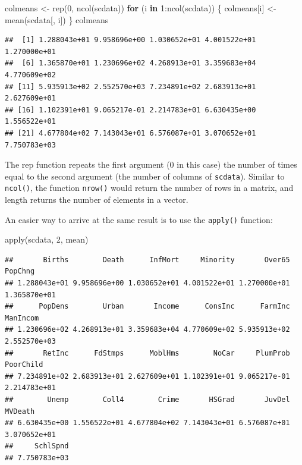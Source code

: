 \documentclass[
]{book}
\newenvironment{Shaded}{\begin{snugshade}}{\end{snugshade}}
\newcommand{\ControlFlowTok}[1]{\textcolor[rgb]{0.13,0.29,0.53}{\textbf{#1}}}
\newcommand{\DecValTok}[1]{\textcolor[rgb]{0.00,0.00,0.81}{#1}}
\newcommand{\FunctionTok}[1]{\textcolor[rgb]{0.00,0.00,0.00}{#1}}
\newcommand{\NormalTok}[1]{#1}
\newcommand{\OtherTok}[1]{\textcolor[rgb]{0.56,0.35,0.01}{#1}}
\newcommand{\SpecialCharTok}[1]{\textcolor[rgb]{0.00,0.00,0.00}{#1}}
\begin{document}
\begin{Shaded}
\begin{Highlighting}[]
\NormalTok{colmeans }\OtherTok{\textless{}{-}} \FunctionTok{rep}\NormalTok{(}\DecValTok{0}\NormalTok{, }\FunctionTok{ncol}\NormalTok{(scdata))}
\ControlFlowTok{for}\NormalTok{ (i }\ControlFlowTok{in} \DecValTok{1}\SpecialCharTok{:}\FunctionTok{ncol}\NormalTok{(scdata)) \{}
\NormalTok{  colmeans[i] }\OtherTok{\textless{}{-}} \FunctionTok{mean}\NormalTok{(scdata[, i])}
\NormalTok{\}}
\NormalTok{colmeans}
\end{Highlighting}
\end{Shaded}

\begin{verbatim}
##  [1] 1.288043e+01 9.958696e+00 1.030652e+01 4.001522e+01 1.270000e+01
##  [6] 1.365870e+01 1.230696e+02 4.268913e+01 3.359683e+04 4.770609e+02
## [11] 5.935913e+02 2.552570e+03 7.234891e+02 2.683913e+01 2.627609e+01
## [16] 1.102391e+01 9.065217e-01 2.214783e+01 6.630435e+00 1.556522e+01
## [21] 4.677804e+02 7.143043e+01 6.576087e+01 3.070652e+01 7.750783e+03
\end{verbatim}

The rep function repeats the first argument (0 in this case) the number of times equal to the second argument (the number of columns of \texttt{scdata}). Similar to \texttt{ncol()}, the function \texttt{nrow()} would return the number of rows in a matrix, and length returns the number of elements in a vector.

An easier way to arrive at the same result is to use the \texttt{apply()} function:

\begin{Shaded}
\begin{Highlighting}[]
\FunctionTok{apply}\NormalTok{(scdata, }\DecValTok{2}\NormalTok{, mean)}
\end{Highlighting}
\end{Shaded}

\begin{verbatim}
##       Births        Death      InfMort     Minority       Over65      PopChng 
## 1.288043e+01 9.958696e+00 1.030652e+01 4.001522e+01 1.270000e+01 1.365870e+01 
##      PopDens        Urban       Income      ConsInc      FarmInc     ManIncom 
## 1.230696e+02 4.268913e+01 3.359683e+04 4.770609e+02 5.935913e+02 2.552570e+03 
##       RetInc      FdStmps      MoblHms        NoCar     PlumProb    PoorChild 
## 7.234891e+02 2.683913e+01 2.627609e+01 1.102391e+01 9.065217e-01 2.214783e+01 
##        Unemp        Coll4        Crime       HSGrad       JuvDel      MVDeath 
## 6.630435e+00 1.556522e+01 4.677804e+02 7.143043e+01 6.576087e+01 3.070652e+01 
##     SchlSpnd 
## 7.750783e+03
\end{verbatim}
\end{document}
